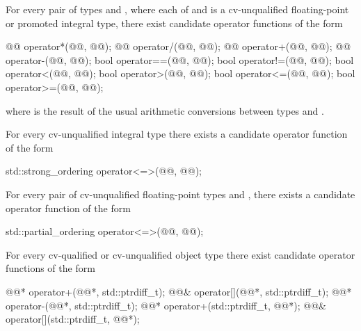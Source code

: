 \pnum
For every pair of types  and ,
where each of  and  is a
cv-unqualified floating-point or promoted integral type,
there exist candidate operator functions of the form
\begin{codeblock}
@@      operator*(@@, @@);
@@      operator/(@@, @@);
@@      operator+(@@, @@);
@@      operator-(@@, @@);
bool    operator==(@@, @@);
bool    operator!=(@@, @@);
bool    operator<(@@, @@);
bool    operator>(@@, @@);
bool    operator<=(@@, @@);
bool    operator>=(@@, @@);
\end{codeblock}
where
is the result of the usual arithmetic conversions between types
and
.

\pnum
For every cv-unqualified integral type 
there exists a candidate operator function of the form
\begin{codeblock}
std::strong_ordering operator<=>(@@, @@);
\end{codeblock}

\pnum
For every pair of cv-unqualified floating-point types
 and ,
there exists a candidate operator function of the form
\begin{codeblock}
std::partial_ordering operator<=>(@@, @@);
\end{codeblock}

\pnum
For every cv-qualified or cv-unqualified object type
there exist candidate operator functions of the form
\begin{codeblock}
@@*      operator+(@@*, std::ptrdiff_t);
@@&      operator[](@@*, std::ptrdiff_t);
@@*      operator-(@@*, std::ptrdiff_t);
@@*      operator+(std::ptrdiff_t, @@*);
@@&      operator[](std::ptrdiff_t, @@*);
\end{codeblock}

